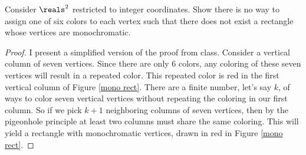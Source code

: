 \begin{example}
	Consider $\reals^2$ restricted to integer coordinates. Show 
	there is no way to assign one of six colors to each vertex such 
	that there does not exist a rectangle whose vertices are 
	monochromatic.
	
	\begin{proof}
		I present a simplified version of the proof from class. 
		Consider a vertical column of seven vertices. Since there 
		are only 6 colors, any coloring of these seven vertices 
		will result in a repeated color. This repeated color is red 
		in the first vertical column of Figure \ref{mono rect}. 
		There are a finite number, let's say $k$, of ways to color 
		seven vertical vertices without repeating the coloring in 
		our first column. So if we pick $k+1$ neighboring columns 
		of seven vertices, then by the pigeonhole principle at 
		least two columns must share the same coloring. This will 
		yield a rectangle with monochromatic vertices, drawn in red 
		in Figure \ref{mono rect}.
	\end{proof}
\end{example}

































